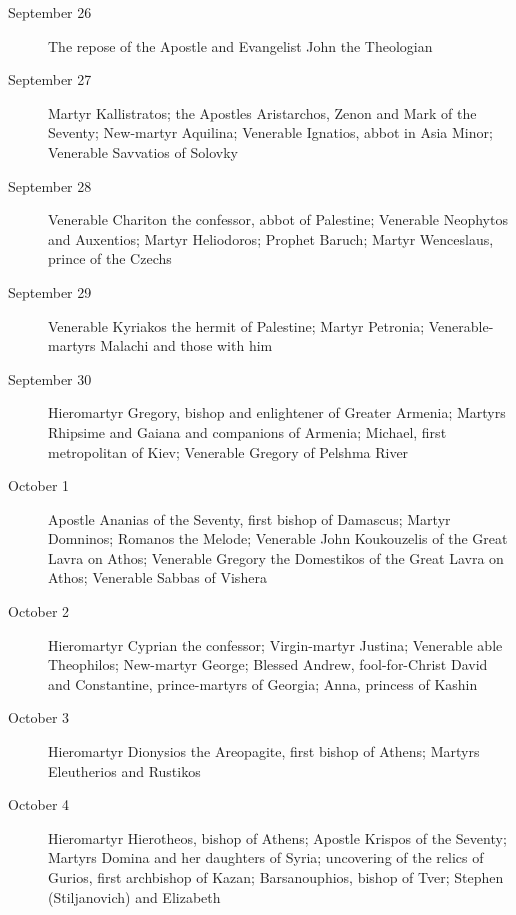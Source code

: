 \begin{description}
\item[September 26]

The repose of the Apostle and Evangelist John the Theologian
\item[September 27]

Martyr Kallistratos; the Apostles Aristarchos, Zenon and Mark of the Seventy; New-martyr Aquilina; Venerable Ignatios, abbot in Asia Minor; Venerable Savvatios of Solovky

\item[September 28]

Venerable Chariton the confessor, abbot of Palestine; Venerable Neophytos and Auxentios; Martyr Heliodoros; Prophet Baruch; Martyr Wenceslaus, prince of the Czechs

\item[September 29]

Venerable Kyriakos the hermit of Palestine; Martyr Petronia; Venerable-martyrs Malachi and those with him

\item[September 30]

Hieromartyr Gregory, bishop and enlightener of Greater Armenia; Martyrs Rhipsime and Gaiana and companions of Armenia; Michael, first metropolitan of Kiev; Venerable Gregory of Pelshma River

\item[October 1]

Apostle Ananias of the Seventy, first bishop of Damascus; Martyr Domninos; Romanos the Melode; Venerable John Koukouzelis of the Great Lavra on Athos; Venerable Gregory the Domestikos of the Great Lavra on Athos; Venerable Sabbas of Vishera

\item[October 2]

Hieromartyr Cyprian the confessor; Virgin-martyr Justina; Venerable able Theophilos; New-martyr George; Blessed Andrew, fool-for-Christ David and Constantine, prince-martyrs of Georgia; Anna, princess of Kashin

\item[October 3]

Hieromartyr Dionysios the Areopagite, first bishop of Athens; Martyrs Eleutherios and Rustikos

\item[October 4]

Hieromartyr Hierotheos, bishop of Athens; Apostle Krispos of the Seventy; Martyrs Domina and her daughters of Syria; uncovering of the relics of Gurios, first archbishop of Kazan; Barsanouphios, bishop of Tver; Stephen (Stiljanovich) and Elizabeth


\end{description}
